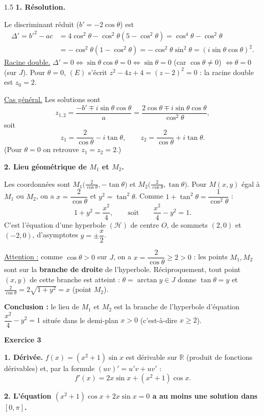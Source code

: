 \documentclass[12pt]{article}
\begin{document}
\begin{spacing}{1.5}
\textbf{1. Résolution.}

Le discriminant réduit ($b'=-2\cos\theta$) est
\begin{align*}
\Delta'=b'^2-ac&=4\cos^2\theta-\cos^2\theta(5-\cos^2\theta)=\cos^4\theta-\cos^2\theta\\
&=-\cos^2\theta(1-\cos^2\theta)=-\cos^2\theta\sin^2\theta=(i\sin\theta\cos\theta)^2.
\end{align*}
\underline{Racine double.} $\Delta'=0\iff\sin\theta\cos\theta=0\iff\sin\theta=0$ (car $\cos\theta\neq0$) $\iff\theta=0$ (sur $J$). Pour $\theta=0$, $(E)$ s'écrit $z^2-4z+4=(z-2)^2=0$ : la racine double est $z_0=2$.

\underline{Cas général.} Les solutions sont
\[
z_{1,2}=\frac{-b'\mp i\sin\theta\cos\theta}{a}=\frac{2\cos\theta\mp i\sin\theta\cos\theta}{\cos^2\theta},
\]
soit
\[
\boxed{z_1=\frac{2}{\cos\theta}-i\tan\theta,\qquad z_2=\frac{2}{\cos\theta}+i\tan\theta}.
\]
(Pour $\theta=0$ on retrouve $z_1=z_2=2$.)

\textbf{2. Lieu géométrique de $M_1$ et $M_2$.}

Les coordonnées sont $M_1\big(\frac{2}{\cos\theta},-\tan\theta\big)$ et $M_2\big(\frac{2}{\cos\theta},\tan\theta\big)$. Pour $M(x,y)$ égal à $M_1$ ou $M_2$, on a $x=\dfrac2{\cos\theta}$ et $y^2=\tan^2\theta$. Comme $1+\tan^2\theta=\dfrac1{\cos^2\theta}$ :
\[
1+y^2=\frac{x^2}{4},\qquad\text{soit}\qquad \frac{x^2}{4}-y^2=1 .
\]
C'est l'équation d'une hyperbole $(\mathcal{H})$ de centre $O$, de sommets $(2,0)$ et $(-2,0)$, d'asymptotes $y=\pm\dfrac x2$.

\underline{Attention :} comme $\cos\theta>0$ sur $J$, on a $x=\dfrac2{\cos\theta}\ge2>0$ : les points $M_1,M_2$ sont sur la \textbf{branche de droite} de l'hyperbole. Réciproquement, tout point $(x,y)$ de cette branche est atteint : $\theta=\arctan y\in J$ donne $\tan\theta=y$ et $\frac{2}{\cos\theta}=2\sqrt{1+y^2}=x$ (point $M_2$).

\textbf{Conclusion :} le lieu de $M_1$ et $M_2$ est la branche de l'hyperbole d'équation $\dfrac{x^2}{4}-y^2=1$ située dans le demi-plan $x>0$ (c'est-à-dire $x\ge2$).

\medskip\textbf{Exercice 3}

\textbf{1. Dérivée.} $f(x)=(x^2+1)\sin x$ est dérivable sur $\mathbb{R}$ (produit de fonctions dérivables) et, par la formule $(uv)'=u'v+uv'$ :
\[
f'(x)=2x\sin x+(x^2+1)\cos x .
\]

\textbf{2. L'équation $(x^2+1)\cos x+2x\sin x=0$ a au moins une solution dans $[0,\pi]$.}


\end{spacing}
\end{document}
